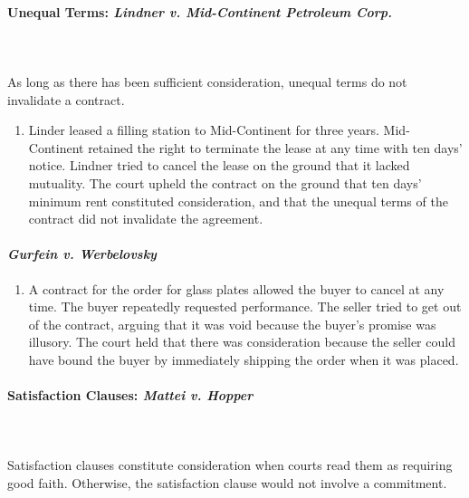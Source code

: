 \paragraph{Unequal Terms: \emph{Lindner v. Mid-Continent Petroleum Corp.}}
~\\\\
As long as there has been sufficient consideration, unequal terms do not 
invalidate a contract.

\begin{enumerate}
    \item Linder leased a filling station to Mid-Continent for three years. 
    Mid-Continent retained the right to terminate the lease at any time with 
    ten days' notice. Lindner tried to cancel the lease on the ground that it 
    lacked mutuality. The court upheld the contract on the ground that ten 
    days' minimum rent constituted consideration, and that the unequal terms 
    of the contract did not invalidate the agreement.
\end{enumerate}

\paragraph{\emph{Gurfein v. Werbelovsky}}

\begin{enumerate}
    \item A contract for the order for glass plates allowed the buyer to 
    cancel at any time. The buyer repeatedly requested performance. The seller 
    tried to get out of the contract, arguing that it was void because the 
    buyer's promise was illusory. The court held that there was consideration 
    because the seller could have bound the buyer by immediately shipping the 
    order when it was placed.
\end{enumerate}

\paragraph{Satisfaction Clauses: \emph{Mattei v. Hopper}}
~\\\\
Satisfaction clauses constitute consideration when courts read them as 
requiring good faith. Otherwise, the satisfaction clause would not involve a 
commitment.


